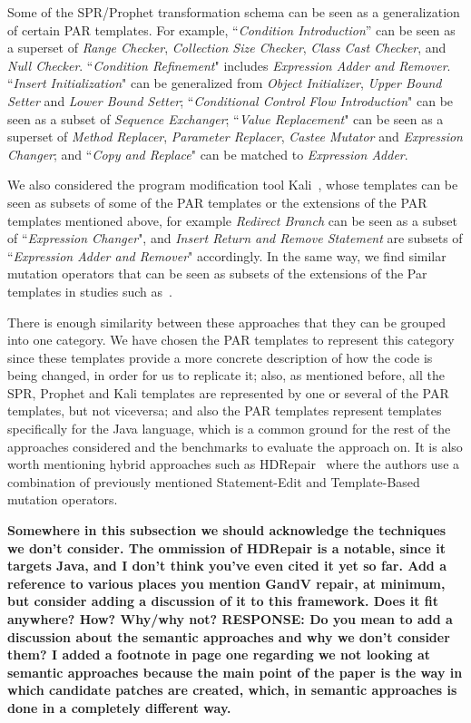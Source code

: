 \documentclass[conference]{IEEEtran}
\newcommand{\todo}[1]
  {{\scriptsize \textbf{\color{red} {#1}}}}
\begin{document}
Some of the SPR/Prophet transformation schema can be seen as a generalization of certain PAR 
templates. For example, ``\emph{Condition Introduction}'' can be seen as a superset of 
\emph{Range Checker}, \emph{Collection Size 
Checker}, \emph{Class Cast Checker}, and \emph{Null Checker}. ``\emph{Condition Refinement}" includes \emph{Expression Adder and Remover}. ``\emph{Insert Initialization}" can be 
generalized from \emph{Object Initializer}, \emph{Upper Bound Setter} and \emph{Lower Bound Setter}; ``\emph{Conditional Control Flow Introduction}" can be 
seen as a subset of \emph{Sequence Exchanger};
``\emph{Value Replacement}" can be seen as a superset of \emph{Method 
Replacer}, \emph{Parameter Replacer}, \emph{Castee Mutator} and \emph{Expression Changer}; and ``\emph{Copy 
and Replace}" can be matched to \emph{Expression Adder}. 

We also considered the program modification tool Kali~\cite{Qi15}, whose
templates can be seen as subsets of some of the PAR templates or the extensions
of the PAR templates mentioned above, for example \emph{Redirect Branch} can be seen as
a subset of ``\emph{Expression Changer}", and \emph{Insert Return and Remove Statement} are
subsets of ``\emph{Expression Adder and Remover}" accordingly. In the same way, we find
similar mutation operators that can be seen as subsets of the extensions of the
Par templates in studies such as~\cite{Offutt96,Offutt06}. 

There is enough similarity between these approaches that they can be grouped 
into one category. We have chosen the PAR templates to represent this category 
since these templates provide a more concrete description of how the code is 
being changed, in order for us to replicate it; also, as mentioned before, all the SPR, Prophet and Kali templates are represented by one or several of the PAR templates, but not viceversa; and also the PAR templates represent templates specifically for the Java language, which is a common ground for the rest of the 
approaches considered and the benchmarks to evaluate the approach on. It is also worth mentioning hybrid approaches such as HDRepair~\cite{xuan16} where the authors use a combination of previously mentioned Statement-Edit and Template-Based mutation operators.


\todo{Somewhere in this subsection we should acknowledge the techniques we don't
  consider.  The ommission of HDRepair is a notable, since it targets Java, and
  I don't think you've even cited it yet so far.  Add a reference to various
  places you mention GandV repair, at minimum, but consider adding a discussion
  of it to this framework.  Does it fit anywhere?  How?  Why/why not? RESPONSE: Do you mean to add a discussion about the semantic approaches and why we don't consider them? I added a footnote in page one regarding we not looking at semantic approaches because the main point of the paper is the way in which candidate patches are created, which, in semantic approaches is done in a completely different way.}
\end{document}
